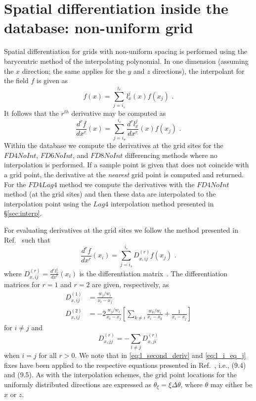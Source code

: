 \documentclass[11pt]{article}
\begin{document}
\section{Spatial differentiation inside the database: non-uniform grid}
Spatial differentiation for grids with non-uniform spacing is performed using the barycentric method of the interpolating polynomial. In one dimension (assuming the $x$ direction; the same applies for the $y$ and $z$ directions), the interpolant for the field $f$ is given as
\begin{equation}
f(x) = \sum_{j=i_s}^{i_e} l^{j}_x(x) f(x_j) \text{ .}
\end{equation}
It follows that the $r^{th}$ derivative may be computed as
\begin{equation}
\frac{d^rf}{dx^r}(x) = \sum_{j=i_s}^{i_e} \frac{d^r l^{j}_x}{dx^r}(x) f(x_j) \text{ .}
\end{equation}
Within the database we compute the derivatives at the grid sites for the $FD4NoInt$, $FD6NoInt$, and $FD8NoInt$ differencing methods where no interpolation is performed. If a sample point is given that does not coincide with a grid point, the derivative at the \textit{nearest} grid point is computed and returned. For the $FD4Lag4$ method we compute the derivatives with the $FD4NoInt$ method (at the grid sites) and then these data are interpolated to the interpolation point using the $Lag4$ interpolation method presented in \S\ref{sec:interp}. 

For evaluating derivatives at the grid sites we follow the method presented in Ref.~\cite{Berrut2004} such that
\begin{equation}
\frac{d^rf}{dx^r}(x_i) = \sum_{j=i_s}^{i_e} D^{(r)}_{x,ij} f(x_j) \text{ .}
\end{equation}
where $D^{(r)}_{x,ij} = \frac{d^r l^{j}_x}{dx^r}(x_i)$ is the differentiation matrix~\cite{Berrut2004}. The differentiation matrices for $r=1$ and $r=2$ are given, respectively, as
\begin{align}
D^{(1)}_{x,ij} &= \frac{w_j / w_i}{x_i - x_j} \\\label{eq:l_second_deriv}
D^{(2)}_{x,ij} &= -2\frac{w_j / w_i}{x_i - x_j}\left[\sum_{k \neq i} \frac{w_k / w_i}{x_i - x_k} + \frac{1}{x_i-x_j}\right]
\end{align}
for $i \neq j$ and
\begin{equation}\label{eq:l_i_eq_j}
D^{(r)}_{x,jj} = -\sum_{i\neq j} D^{(r)}_{x,ji}
\end{equation}
when $i = j$ for all $r>0$. We note that in \eqref{eq:l_second_deriv} and \eqref{eq:l_i_eq_j} fixes have been applied to the respective equations presented in Ref.~\cite{Berrut2004}, i.e., (9.4) and (9.5). As with the interpolation schemes, the grid point locations for the uniformly distributed directions are expressed as $\theta_\xi = \xi \Delta\theta$, where $\theta$ may either be $x$ or $z$. 
\end{document}
